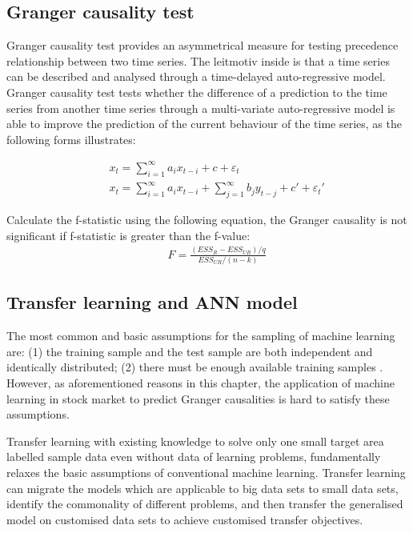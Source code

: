 \subsection{Granger causality test}
Granger causality test \cite{granger1969investigating} provides an asymmetrical measure for testing precedence relationship between two time series. The leitmotiv inside is that a time series can be described and analysed through a time-delayed auto-regressive model. Granger causality test tests whether the difference of a prediction to the time series from another time series through a multi-variate auto-regressive model is able to improve the prediction of the current behaviour of the time series, as the following forms illustrates:

\begin{eqnarray}
&&	x_t=\sum_{i=1}^{\infty}a_ix_{t-i}+c+\varepsilon_{t}\\
&&x_t=\sum_{i=1}^{\infty}a_ix_{t-i}+\sum_{j=1}^{\infty}b_jy_{t-j}+c'+\varepsilon_{t}'
\end{eqnarray}

Calculate the f-statistic using the following equation, the Granger causality is not significant if f-statistic is greater than the f-value:
\begin{eqnarray}
&&	F=\frac{(ESS_R-ESS_{UR})/q}{ESS_{UR}/(n-k)}
\end{eqnarray}

\subsection{Transfer learning and ANN model}
\label{sbs:transfer}
The most common and basic assumptions for the sampling of machine learning are: (1) the training sample and the test sample are both independent and identically distributed; (2) there must be enough available training samples \cite{rasmussen2004gaussian}. However, as aforementioned reasons in this chapter, the application of machine learning in stock market to predict Granger causalities is hard to satisfy these assumptions.

Transfer learning with existing knowledge to solve only one small target area labelled sample data even without data of learning problems, fundamentally relaxes the basic assumptions of conventional machine learning. Transfer learning can migrate the models which are applicable to big data sets to small data sets, identify the commonality of different problems, and then transfer the generalised model on customised data sets to achieve customised transfer objectives.

